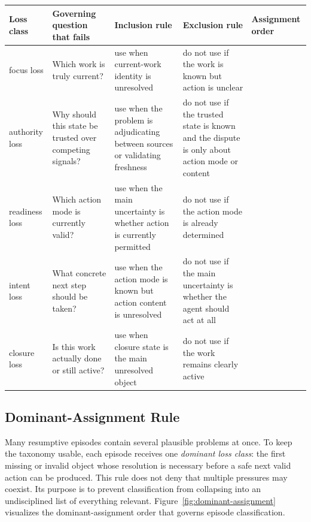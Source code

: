 \documentclass[a4paper,fleqn]{cas-dc}
\begin{document}
\begin{strip}
\captionsetup{type=table}
\label{tab:loss-classes}
\centering
\footnotesize
\setlength{\tabcolsep}{4pt}
\renewcommand{\arraystretch}{1.05}
\begin{tabularx}{\textwidth}{>{\raggedright\arraybackslash}p{} >{\raggedright\arraybackslash}p{} >{\raggedright\arraybackslash}p{} >{\raggedright\arraybackslash}p{} >{\raggedright\arraybackslash}p{}}
\toprule
Loss class & Governing question that fails & Inclusion rule & Exclusion rule & Assignment order \\
\midrule
focus loss & Which work is truly current? & use when current-work identity is unresolved & do not use if the work is known but action is unclear & 1 \\
authority loss & Why should this state be trusted over competing signals? & use when the problem is adjudicating between sources or validating freshness & do not use if the trusted state is known and the dispute is only about action mode or content & 2 \\
readiness loss & Which action mode is currently valid? & use when the main uncertainty is whether action is currently permitted & do not use if the action mode is already determined & 3 \\
intent loss & What concrete next step should be taken? & use when the action mode is known but action content is unresolved & do not use if the main uncertainty is whether the agent should act at all & 4 \\
closure loss & Is this work actually done or still active? & use when closure state is the main unresolved object & do not use if the work remains clearly active & 5 \\
\bottomrule
\end{tabularx}
\end{strip}

\subsection{Dominant-Assignment Rule}

Many resumptive episodes contain several plausible problems at once. To keep the taxonomy usable, each episode receives one \emph{dominant loss class}: the first missing or invalid object whose resolution is necessary before a safe next valid action can be produced. This rule does not deny that multiple pressures may coexist. Its purpose is to prevent classification from collapsing into an undisciplined list of everything relevant. Figure~\ref{fig:dominant-assignment} visualizes the dominant-assignment order that governs episode classification.
\end{document}
